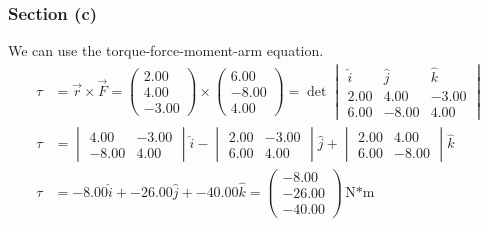\documentclass[12pt]{article}
\begin{document}
\subsubsection{Section (c)}
We can use the torque-force-moment-arm equation.
\begin{align}
    \tau    &=  \vec{r} \times \vec{F}
        =   \begin{pmatrix}2.00\\4.00\\-3.00\end{pmatrix} \times \begin{pmatrix}6.00\\-8.00\\4.00\end{pmatrix}
        =   \det\begin{vmatrix}
            \hat{i} &\hat{j}&\hat{k}\\
            2.00    &4.00   &-3.00  \\
            6.00    &-8.00  &4.00
        \end{vmatrix}\\
    \tau    &=  \begin{vmatrix}4.00&-3.00\\-8.00&4.00\end{vmatrix}\hat{i} -
                \begin{vmatrix}2.00&-3.00\\6.00&4.00\end{vmatrix} \hat{j} +
                \begin{vmatrix}2.00&4.00\\6.00&-8.00\end{vmatrix} \hat{k}\\
    \tau    &=  -8.00\hat{i} + -26.00\hat{j} + -40.00\hat{k}
        =   \boxed{\begin{pmatrix}-8.00\\-26.00\\-40.00\end{pmatrix}\unit{\newton*\meter}}
\end{align}
\end{document}
